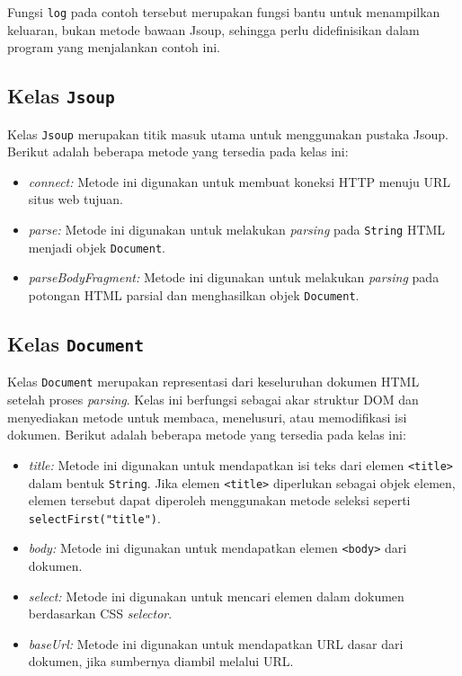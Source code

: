 Fungsi \texttt{log} pada contoh tersebut merupakan fungsi bantu untuk menampilkan keluaran, bukan metode bawaan Jsoup, sehingga perlu didefinisikan dalam program yang menjalankan contoh ini.


\subsection{Kelas \texttt{Jsoup}}
Kelas \texttt{Jsoup} merupakan titik masuk utama untuk menggunakan pustaka Jsoup. Berikut adalah beberapa metode yang tersedia pada kelas ini:

\begin{itemize}[itemsep=0mm]
    \item \textit{connect:}
    Metode ini digunakan untuk membuat koneksi HTTP menuju URL situs web tujuan.
    
    \item \textit{parse:}
    Metode ini digunakan untuk melakukan \textit{parsing} pada \texttt{String} HTML menjadi objek \texttt{Document}.
    
    \item \textit{parseBodyFragment:}
    Metode ini digunakan untuk melakukan \textit{parsing} pada potongan HTML parsial dan menghasilkan objek \texttt{Document}.
\end{itemize}

\subsection{Kelas \texttt{Document}}
Kelas \texttt{Document} merupakan representasi dari keseluruhan dokumen HTML setelah proses \textit{parsing}. Kelas ini berfungsi sebagai akar struktur DOM dan menyediakan metode untuk membaca, menelusuri, atau memodifikasi isi dokumen. Berikut adalah beberapa metode yang tersedia pada kelas ini:

\begin{itemize}[itemsep=0mm]
    \item \textit{title:}
    Metode ini digunakan untuk mendapatkan isi teks dari elemen \texttt{<title>} dalam bentuk \texttt{String}. Jika elemen \texttt{<title>} diperlukan sebagai objek elemen, elemen tersebut dapat diperoleh menggunakan metode seleksi seperti \texttt{selectFirst("title")}.
    
    \item \textit{body:}
    Metode ini digunakan untuk mendapatkan elemen \texttt{<body>} dari dokumen.
    
    \item \textit{select:}
    Metode ini digunakan untuk mencari elemen dalam dokumen berdasarkan CSS \textit{selector}.
    
    \item \textit{baseUrl:}
    Metode ini digunakan untuk mendapatkan URL dasar dari dokumen, jika sumbernya diambil melalui URL.
    
\end{itemize}

